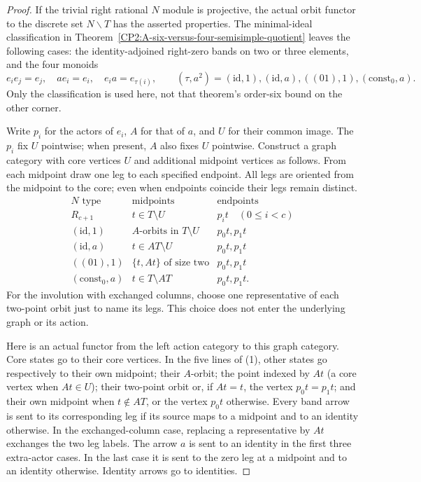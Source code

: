\begin{proof}
If the trivial right rational $N$ module is projective, the
actual orbit functor to the discrete set $N\backslash T$ has
the asserted properties. The minimal-ideal classification in
Theorem~\ref{CP2:A-six-versus-four-semisimple-quotient} leaves
the following cases: the identity-adjoined right-zero bands
on two or three elements, and the four monoids
\[
 e_i e_j=e_j,\quad ae_i=e_i,\quad e_i a=e_{\tau(i)},
 \qquad (\tau,a^2)=(\mathrm{id},1),(\mathrm{id},a),
 ((01),1),(\mathrm{const}_0,a).
\]
Only the classification is used here, not that theorem's
order-six bound on the other corner.

Write $p_i$ for the actors of $e_i$, $A$ for that of $a$,
and $U$ for their common image. The $p_i$ fix $U$ pointwise;
when present, $A$ also fixes $U$ pointwise. Construct a graph
category with core vertices $U$ and additional midpoint
vertices as follows. From each midpoint draw one leg to
each specified endpoint. All legs are oriented from the
midpoint to the core; even when endpoints coincide their
legs remain distinct.
\[
\begin{array}{c|c|c}
N\text{ type}&\text{midpoints}&\text{endpoints}\\\hline
R_{c+1}&t\in T\setminus U&p_i t\quad(0\leq i<c)\\
(\mathrm{id},1)&A\text{-orbits in }T\setminus U&p_0t,p_1t\\
(\mathrm{id},a)&t\in AT\setminus U&p_0t,p_1t\\
((01),1)&\{t,At\}\text{ of size two}&p_0t,p_1t\\
(\mathrm{const}_0,a)&t\in T\setminus AT&p_0t,p_1t.
\end{array}                                                    \tag{1}
\]
For the involution with exchanged columns, choose one
representative of each two-point orbit just to name its legs.
This choice does not enter the underlying graph or its action.

Here is an actual functor from the left action category to
this graph category. Core states go to their core vertices.
In the five lines of (1), other states go respectively to
their own midpoint; their $A$-orbit; the point indexed by
$At$ (a core vertex when $At\in U$); their two-point orbit
or, if $At=t$, the vertex $p_0t=p_1t$; and their own midpoint
when $t\notin AT$, or the vertex $p_0t$ otherwise.
Every band arrow is sent to its corresponding leg if its
source maps to a midpoint and to an identity otherwise.
In the exchanged-column case, replacing a representative
by $At$ exchanges the two leg labels. The arrow $a$ is
sent to an identity in the first three extra-actor cases.
In the last case it is sent to the zero leg at a midpoint
and to an identity otherwise. Identity arrows go to identities.


\end{proof}
